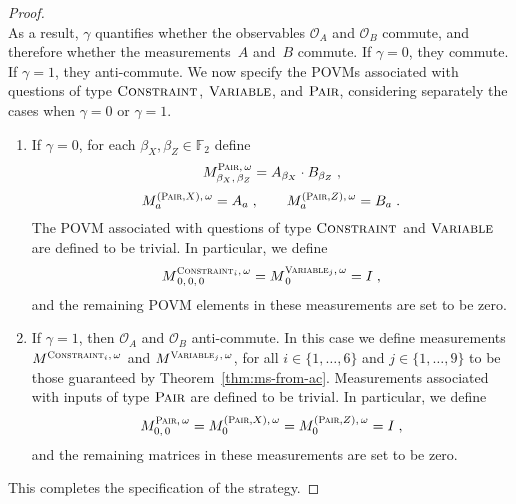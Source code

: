 \documentclass[11pt]{article}
\theoremstyle{definition}
\newcommand{\F}{\ensuremath{\mathbb{F}}}
\newcommand{\typestyle}[1]{\ensuremath{\textsc{#1}}\xspace}
\newcommand{\Pair}{\typestyle{Pair}}
\newcommand{\Constraint}{\typestyle{Constraint}}
\newcommand{\Variable}{\typestyle{Variable}}
\begin{document}
\begin{proof}
\begin{equation*}
  \end{equation*}
  As a result, $\gamma$ quantifies whether the observables $\mathcal{O}_A$ and $\mathcal{O}_B$ commute,
  and therefore whether the measurements~$A$ and~$B$ commute.
  If $\gamma = 0$, they commute. If $\gamma = 1$, they anti-commute.
  We now specify the  POVMs associated with questions of type $\Constraint$,
  $\Variable$, and $\Pair$, 
  considering separately the cases when $\gamma = 0$ or $\gamma = 1$.
  \begin{enumerate}
  \item If $\gamma = 0$, 
     for each $\beta_X, \beta_Z \in \F_2$ define
    \begin{equation}\label{eq:pair-definition}
      M^{\Pair,\, \omega}_{\beta_X,\, \beta_Z} = A_{\beta_X} \cdot B_{\beta_Z}\;,
    \end{equation}
    \begin{equation*}
      M^{(\Pair,X),\, \omega}_{a} = A_{a} \;,\qquad
      M^{(\Pair,Z),\, \omega}_{a} = B_{a}\;.
    \end{equation*}
    The POVM associated with questions of type $\Constraint$ and $\Variable$ are
    defined to be trivial.
    In particular, we define
    \begin{equation*}
      M^{\Constraint_i,\, \omega}_{\, 0,\, 0,\, 0}
      = M^{\Variable_j,\, \omega}_{\, 0} = I\;,
    \end{equation*}
    and the remaining POVM elements in these measurements are set to be zero.
  \item If $\gamma = 1$, then $\mathcal{O}_A$ and $\mathcal{O}_B$ anti-commute.
    In this case we define measurements $M^{\Constraint_i,\, \omega}$ and
    $M^{\Variable_j,\, \omega}$, for all $i\in\{1,\ldots,6\}$ and $j
    \in\{1,\ldots,9\}$ to be those guaranteed by Theorem~\ref{thm:ms-from-ac}.
    Measurements associated with inputs of type $\Pair$ are defined to be
    trivial.
    In particular, we define
    \begin{equation*}
      M^{\Pair,\, \omega}_{0,\, 0} = M^{(\Pair,X),\, \omega}_{0} = M^{(\Pair,Z),\, \omega}_{0} = I\;,
    \end{equation*}
    and the remaining matrices in these measurements are set to be zero.
  \end{enumerate}
  This completes the specification of the strategy.


\end{proof}
\end{document}
